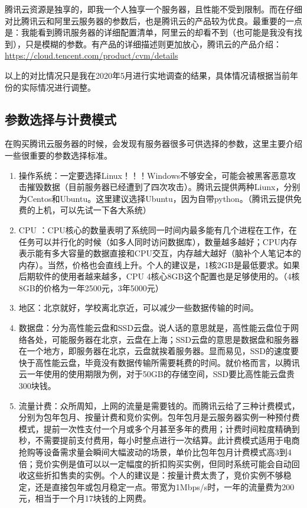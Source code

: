 \documentclass[lang=cn,hazy,normal,blue,12pt]{elegantnote}
\begin{document}
腾讯云资源是独享的，即我一个人独享一个服务器，且性能不受到限制。而在仔细对比腾讯云和阿里云服务器的参数后，也是腾讯云的产品较为优良。最重要的一点是：我能看到腾讯服务器的详细配置清单，阿里云的却看不到（也可能是我没有找到），只是模糊的参数。有产品的详细描述则更加放心，腾讯云的产品介绍：\href{Details}{https://cloud.tencent.com/product\-/cvm/details}

\begin{note}
以上的对比情况只是我在2020年5月进行实地调查的结果，具体情况请根据当前年份的实际情况进行调整。
\end{note}

\subsection{参数选择与计费模式}

在购买腾讯云服务器的时候，会发现有服务器很多可供选择的参数，这里主要介绍一些很重要的参数选择标准。

\begin{enumerate}
    \item 操作系统：一定要选择Linux！！！Windows不够安全，可能会被黑客恶意攻击摧毁数据（目前服务器已经遭到了四次攻击）。腾讯云提供两种Liunx，分别为Centos和Ubuntu。这里建议选择Ubuntu，因为自带python。（腾讯云提供免费的上机，可以先试一下各大系统）
    \item CPU ：CPU核心的数量表明了系统同一时间内最多能有几个进程在工作，在任务可以并行化的时候（如多人同时访问数据库），数量越多越好；CPU内存表示能有多大容量的数据直接和CPU交互，内存越大越好（脑补个人笔记本的内存）。当然，价格也会直线上升。个人的建议是，1核2GB是最低要求。如果后期软件的使用者越来越多，CPU 4核心8GB这个配置也是足够使用的。（4核8GB的价格为一年2500元，3年5000元）
    \item 地区：北京就好，学校离北京近，可以减少一些数据传输的时间。
    \item 数据盘：分为高性能云盘和SSD云盘。说人话的意思就是，高性能云盘位于网络各处，可能服务器在北京，云盘在上海；SSD云盘的意思是数据盘和服务器在一个地方，即服务器在北京，云盘就挨着服务器。显而易见，SSD的速度要快于高性能云盘，毕竟没有数据传输所需要耗费的时间。就价格而言，以腾讯云一年使用的使用期限为例，对于50GB的存储空间，SSD要比高性能云盘贵300块钱。
    \item 流量计费：众所周知，上网的流量是需要钱的。而腾讯云给了三种计费模式，分别为包年包月、按量计费和竞价实例。包年包月是云服务器实例一种预付费模式，提前一次性支付一个月或多个月甚至多年的费用；计费时间粒度精确到秒，不需要提前支付费用，每小时整点进行一次结算。此计费模式适用于电商抢购等设备需求量会瞬间大幅波动的场景，单价比包年包月计费模式高3到4倍；竞价实例是值可以以一定幅度的折扣购买实例，但同时系统可能会自动回收这些折扣售卖的实例。个人的建议是：按量计费太贵了，竞价实例不够稳定，还是直接包年或包月稳定一点。带宽为1Mbps/s时，一年的流量费为200元，相当于一个月17块钱的上网费。
\end{enumerate}
\end{document}
